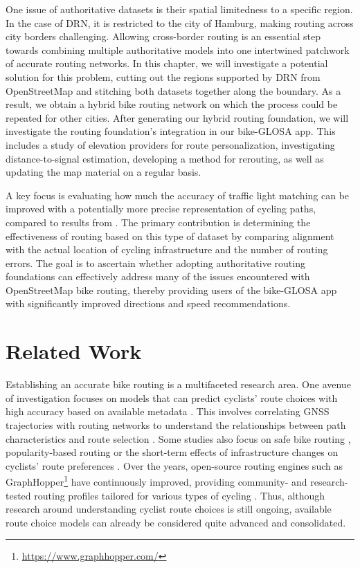 One issue of authoritative datasets is their spatial limitedness to a specific region. In the case of DRN, it is restricted to the city of Hamburg, making routing across city borders challenging. Allowing cross-border routing is an essential step towards combining multiple authoritative models into one intertwined patchwork of accurate routing networks. In this chapter, we will investigate a potential solution for this problem, cutting out the regions supported by DRN from OpenStreetMap and stitching both datasets together along the boundary. As a result, we obtain a hybrid bike routing network on which the process could be repeated for other cities. After generating our hybrid routing foundation, we will investigate the routing foundation's integration in our bike-GLOSA app. This includes a study of elevation providers for route personalization, investigating distance-to-signal estimation, developing a method for rerouting, as well as updating the map material on a regular basis.

A key focus is evaluating how much the accuracy of traffic light matching can be improved with a potentially more precise representation of cycling paths, compared to results from . The primary contribution is determining the effectiveness of routing based on this type of dataset by comparing alignment with the actual location of cycling infrastructure and the number of routing errors. The goal is to ascertain whether adopting authoritative routing foundations can effectively address many of the issues encountered with OpenStreetMap bike routing, thereby providing users of the bike-GLOSA app with significantly improved directions and speed recommendations.

\section{Related Work}\label{sec:rw-uis}

Establishing an accurate bike routing is a multifaceted research area. One avenue of investigation focuses on models that can predict cyclists' route choices with high accuracy based on available metadata \cite{dill_understanding_2008, ghanayim_modelling_2018, huber_modelling_2021}. This involves correlating GNSS trajectories with routing networks to understand the relationships between path characteristics and route selection \cite{sultan_extracting_2017, huber_modelling_2021}. Some studies also focus on safe bike routing \cite{loidl_online_2018}, popularity-based routing \cite{bergman_conflation_2016} or the short-term effects of infrastructure changes on cyclists' route preferences \cite{yeboah_route_2015, pritchard_does_2019}. Over the years, open-source routing engines such as GraphHopper\footnote{\url{https://www.graphhopper.com/}} have continuously improved, providing community- and research-tested routing profiles tailored for various types of cycling \cite{krismer_elevation_2016}. Thus, although research around understanding cyclist route choices is still ongoing, available route choice models can already be considered quite advanced and consolidated.

